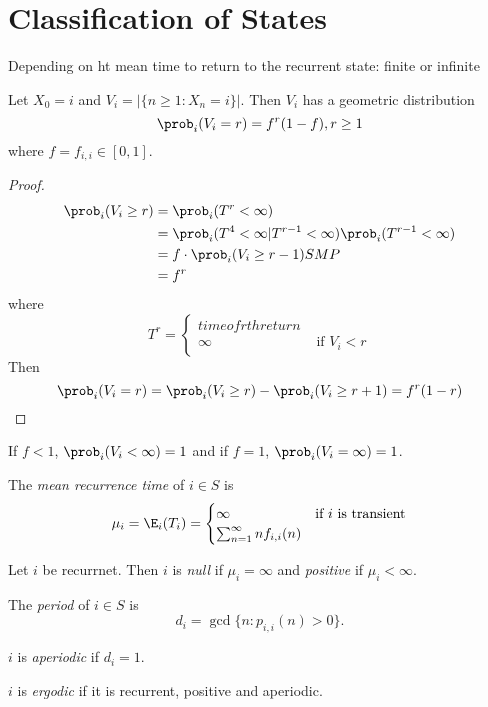 \documentclass[a4paper]{article}
\begin{document}
\section{Classification of States}

Depending on ht mean time to return to the recurrent state: finite or infinite

\begin{theorem}
  Let \(X_0 = i\) and \(V_i = |\{n \geq 1: X_n = i\}|\). Then \(V_i\) has a geometric distribution
  \[
    \prob_i(V_i = r) = f^r (1 - f), r \geq 1
  \]
  where \(f = f_{i, i} \in [0, 1]\).
\end{theorem}

\begin{proof}
  \begin{align*}
    \prob_i(V_i \geq r) &= \prob_i(T^r < \infty) \\
                        &= \prob_i(T^4 < \infty | T^{r - 1} < \infty) \prob_i(T^{r - 1} < \infty) \\
                        &= f \cdot \prob_i(V_i \geq r - 1) SMP \\
                        &= f^r
  \end{align*}
  where
  \[
    T^r =
    \begin{cases}
      time of rth return & \\
      \infty & \text{ if } V_i < r
    \end{cases}
  \]
  Then
  \[
    \prob_i(V_i = r) = \prob_i(V_i \geq r) - \prob_i(V_i \geq r + 1) = f^r(1 - r)
  \]
\end{proof}

\begin{note}
  If \(f < 1\), \(\prob_i(V_i < \infty) = 1\) and if \(f = 1\), \(\prob_i(V_i = \infty) = 1\).
\end{note}

\begin{definition}
  The \emph{mean recurrence time} of \(i \in S\) is
  \[
    \mu_i = \E_i(T_i) =
    \begin{cases}
      \infty & \text{if \(i\) is transient} \\
      \sum_{n = 1}^{\infty} n f_{i,i}(n) &
    \end{cases}
  \]

  Let \(i\) be recurrnet. Then \(i\) is \emph{null} if \(\mu_i = \infty\) and \emph{positive} if \(\mu_i < \infty\).

  The \emph{period} of \(i \in S\) is
  \[
    d_i = \gcd\{n: p_{i,i}(n) > 0 \}.
  \]

  \(i\) is \emph{aperiodic} if \(d_i = 1\).

  \(i\) is \emph{ergodic} if it is recurrent, positive and aperiodic.
\end{definition}
\end{document}
